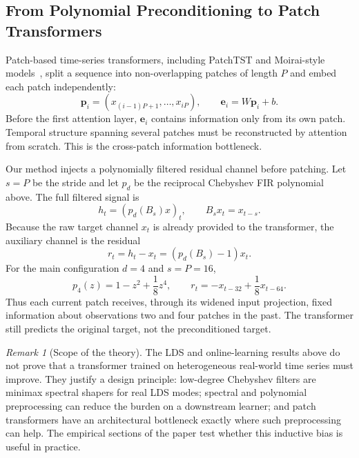 \documentclass[11pt]{article}
\theoremstyle{plain}
\theoremstyle{definition}
\theoremstyle{remark}
\newtheorem{remark}[theorem]{Remark}
\begin{document}
\subsection{From Polynomial Preconditioning to Patch Transformers}
\label{sec:patch-transformer-connection}

Patch-based time-series transformers, including PatchTST and Moirai-style models~\citep{nie2023patchtst,liu2024moirai2}, split a sequence into non-overlapping patches of length $P$ and embed each patch independently:
\[
    \mathbf p_i=(x_{(i-1)P+1},\ldots,x_{iP}),
    \qquad
    \mathbf e_i=W\mathbf p_i+b.
\]
Before the first attention layer, $\mathbf e_i$ contains information only from its own patch. Temporal structure spanning several patches must be reconstructed by attention from scratch. This is the cross-patch information bottleneck.

Our method injects a polynomially filtered residual channel before patching. Let $s=P$ be the stride and let $p_d$ be the reciprocal Chebyshev FIR polynomial above. The full filtered signal is
\[
    h_t=(p_d(B_s)x)_t,
    \qquad
    B_s x_t=x_{t-s}.
\]
Because the raw target channel $x_t$ is already provided to the transformer, the auxiliary channel is the residual
\begin{equation}
    r_t=h_t-x_t=(p_d(B_s)-1)x_t.
    \label{eq:residual-channel}
\end{equation}
For the main configuration $d=4$ and $s=P=16$,
\[
    p_4(z)=1-z^2+\frac18 z^4,
    \qquad
    r_t=-x_{t-32}+\frac18 x_{t-64}.
\]
Thus each current patch receives, through its widened input projection, fixed information about observations two and four patches in the past. The transformer still predicts the original target, not the preconditioned target.

\begin{remark}[Scope of the theory]
The LDS and online-learning results above do not prove that a transformer trained on heterogeneous real-world time series must improve. They justify a design principle: low-degree Chebyshev filters are minimax spectral shapers for real LDS modes; spectral and polynomial preprocessing can reduce the burden on a downstream learner; and patch transformers have an architectural bottleneck exactly where such preprocessing can help. The empirical sections of the paper test whether this inductive bias is useful in practice.
\end{remark}
\end{document}
